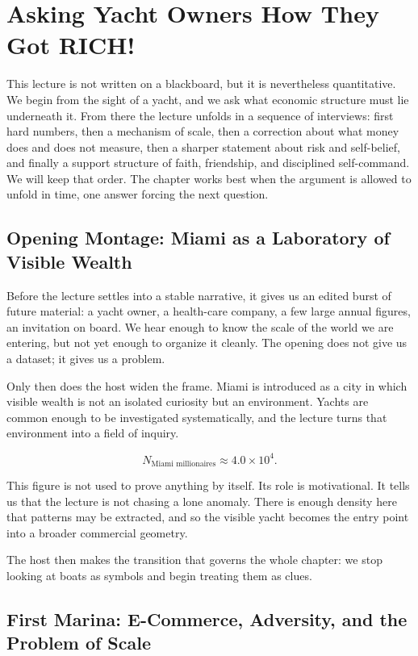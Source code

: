 \chapter{Asking Yacht Owners How They Got RICH!}

This lecture is not written on a blackboard, but it is nevertheless quantitative. We begin from the sight of a yacht, and we ask what economic structure must lie underneath it. From there the lecture unfolds in a sequence of interviews: first hard numbers, then a mechanism of scale, then a correction about what money does and does not measure, then a sharper statement about risk and self-belief, and finally a support structure of faith, friendship, and disciplined self-command. We will keep that order. The chapter works best when the argument is allowed to unfold in time, one answer forcing the next question.

\section{Opening Montage: Miami as a Laboratory of Visible Wealth}

Before the lecture settles into a stable narrative, it gives us an edited burst of future material: a yacht owner, a health-care company, a few large annual figures, an invitation on board. We hear enough to know the scale of the world we are entering, but not yet enough to organize it cleanly. The opening does not give us a dataset; it gives us a problem.

Only then does the host widen the frame. Miami is introduced as a city in which visible wealth is not an isolated curiosity but an environment. Yachts are common enough to be investigated systematically, and the lecture turns that environment into a field of inquiry.

\begin{equation}
N_{\text{Miami millionaires}} \approx 4.0\times 10^{4}.
\end{equation}

This figure is not used to prove anything by itself. Its role is motivational. It tells us that the lecture is not chasing a lone anomaly. There is enough density here that patterns may be extracted, and so the visible yacht becomes the entry point into a broader commercial geometry.

The host then makes the transition that governs the whole chapter: we stop looking at boats as symbols and begin treating them as clues.

\section{First Marina: E-Commerce, Adversity, and the Problem of Scale}

